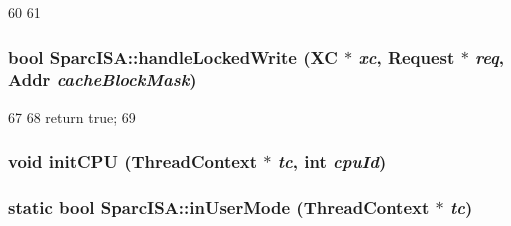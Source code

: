 \begin{DoxyCode}
60 {
61 }
\end{DoxyCode}
\hypertarget{namespaceSparcISA_a51c8abbc4167f28f928dcf5413bfd23d}{
\subsubsection[{handleLockedWrite}]{\setlength{\rightskip}{0pt plus 5cm}bool SparcISA::handleLockedWrite (XC $\ast$ {\em xc}, \/  {\bf Request} $\ast$ {\em req}, \/  {\bf Addr} {\em cacheBlockMask})}}
\label{namespaceSparcISA_a51c8abbc4167f28f928dcf5413bfd23d}



\begin{DoxyCode}
67 {
68     return true;
69 }
\end{DoxyCode}
\hypertarget{namespaceSparcISA_aded557a1e716c6f849b0e0b05fc77676}{
\subsubsection[{initCPU}]{\setlength{\rightskip}{0pt plus 5cm}void initCPU ({\bf ThreadContext} $\ast$ {\em tc}, \/  int {\em cpuId})}}
\label{namespaceSparcISA_aded557a1e716c6f849b0e0b05fc77676}
\hypertarget{namespaceSparcISA_accf04e5f1db51bd27beab2f091d4e999}{
\subsubsection[{inUserMode}]{\setlength{\rightskip}{0pt plus 5cm}static bool SparcISA::inUserMode ({\bf ThreadContext} $\ast$ {\em tc})}}
\label{namespaceSparcISA_accf04e5f1db51bd27beab2f091d4e999}



